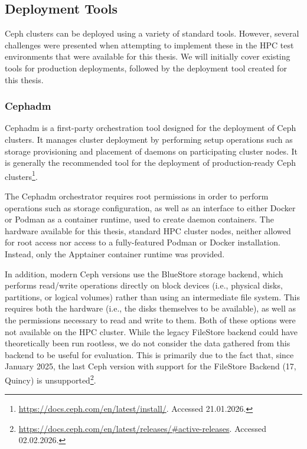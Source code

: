 \subsection{Deployment Tools}

Ceph clusters can be deployed using a variety of standard tools. However,
several challenges were presented when attempting to implement these in the
\ac{HPC} test environments that were available for this thesis. We will
initially cover existing tools for production deployments, followed by the
deployment tool created for this thesis.

\subsubsection{Cephadm}
\label{sec:cephadm}

Cephadm is a first-party orchestration tool designed for the deployment of Ceph clusters. It manages cluster deployment by performing setup operations such as storage provisioning and placement of daemons on participating cluster nodes. It is generally the recommended tool for the deployment of production-ready Ceph clusters\footnote{\url{https://docs.ceph.com/en/latest/install/}. Accessed 21.01.2026.}.

The Cephadm orchestrator requires root permissions in order to perform operations such as storage configuration, as well as an interface to either Docker or Podman as a container runtime, used to create daemon containers. The hardware available for this thesis, standard \ac{HPC} cluster nodes, neither allowed for root access nor access to a fully-featured Podman or Docker installation. Instead, only the Apptainer container runtime was provided.

In addition, modern Ceph versions use the BlueStore storage backend, which performs read/write operations directly on block devices (i.e., physical disks, partitions, or logical volumes) rather than using an intermediate file system. This requires both the hardware (i.e., the disks themselves to be available), as well as the permissions necessary to read and write to them. Both of these options were not available on the \ac{HPC} cluster. While the legacy FileStore backend could have theoretically been run rootless, we do not consider the data gathered from this backend to be useful for evaluation. This is primarily due to the fact that, since January 2025, the last Ceph version with support for the FileStore Backend (17, Quincy) is unsupported\footnote{\url{https://docs.ceph.com/en/latest/releases/\#active-releases}. Accessed 02.02.2026.}.

